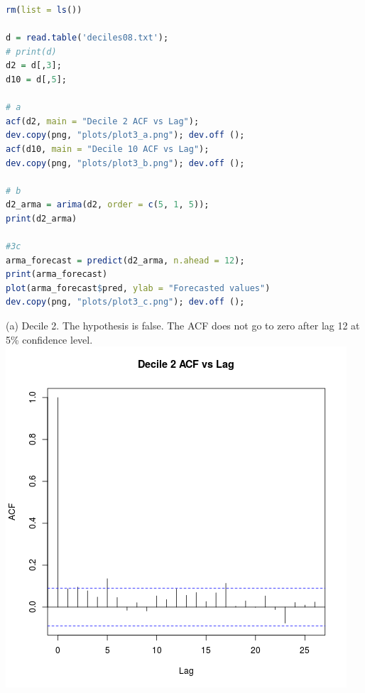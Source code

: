 \documentclass{article}
\begin{document}

\begin{lstlisting}[language=R]
rm(list = ls())

d = read.table('deciles08.txt');
# print(d)
d2 = d[,3];
d10 = d[,5];

# a
acf(d2, main = "Decile 2 ACF vs Lag");
dev.copy(png, "plots/plot3_a.png"); dev.off ();
acf(d10, main = "Decile 10 ACF vs Lag");
dev.copy(png, "plots/plot3_b.png"); dev.off ();

# b
d2_arma = arima(d2, order = c(5, 1, 5));
print(d2_arma)

#3c
arma_forecast = predict(d2_arma, n.ahead = 12);
print(arma_forecast)
plot(arma_forecast$pred, ylab = "Forecasted values")
dev.copy(png, "plots/plot3_c.png"); dev.off ();
\end{lstlisting}

(a)
Decile 2. The hypothesis is false. The ACF does not go to zero after lag 12 at 5\% confidence level.
\includegraphics{"plot3_a"}
\pagebreak
\end{document}
